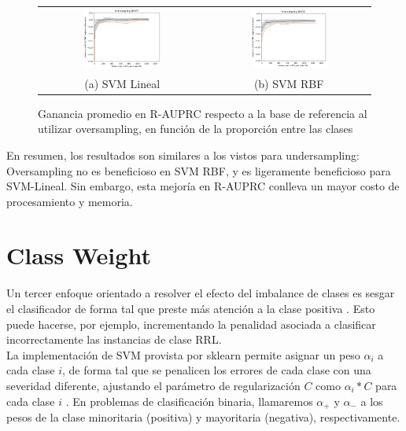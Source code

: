 \begin{figure}[h!]
\begin{tabular}{cc}
    \includegraphics[width=0.49\textwidth]{Kap7/SMOTE_linearBEST.png} & \includegraphics[width=0.49\textwidth]{Kap7/SMOTE_rbfBEST.png} \\
(a) SVM Lineal& (b) SVM RBF
\end{tabular}
\caption{ Ganancia promedio en R-AUPRC respecto a la base de referencia al utilizar oversampling, en función de la proporción entre las clases }
\label{fig:overall_oversampling}
\end{figure}

En resumen, los resultados son similares a los vistos para undersampling: Oversampling no es beneficioso en SVM RBF, y es ligeramente beneficioso para SVM-Lineal. Sin embargo, esta mejoría en R-AUPRC conlleva un mayor costo de procesamiento y memoria. 

\section{Class Weight}

Un tercer enfoque orientado a resolver el efecto del imbalance de clases es sesgar el clasificador de forma tal que preste más atención a la clase positiva \cite{imbalanced_svm}. Esto puede hacerse, por ejemplo, incrementando la penalidad asociada a clasificar incorrectamente las instancias de clase RRL. \\

La implementación de SVM provista por sklearn permite asignar un peso $\alpha_i$ a cada clase $i$, de forma tal que se penalicen los errores de cada clase con una severidad diferente, ajustando el parámetro de regularización $C$ como $\alpha_i * C$ para cada clase $i$ . En problemas de clasificación binaria, llamaremos $\alpha_+$ y $\alpha_-$ a los pesos de la clase minoritaria (positiva) y mayoritaria (negativa), respectivamente. \\

